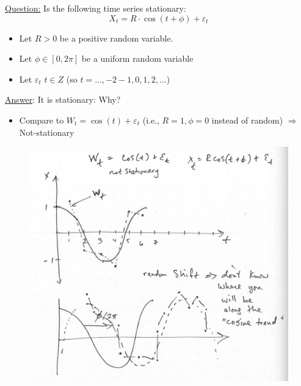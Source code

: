 \underline{Question:} Is the following time series stationary:\\
    \[X_t = R \cdot \cos(t+ \phi) + \varepsilon_t\] 
\begin{itemize}
    \item[] Let $R>0$ be a positive random variable.
    \item[] Let $\phi \in [0, 2\pi]$ be a uniform random variable
    \item[] Let $\varepsilon_t$ $t \in Z$ (so $t=...,-2-1,0,1,2,...$)
\end{itemize}
\underline{Answer}: It is stationary: Why? 
\begin{itemize}
    \item[] Compare to $W_t = \cos(t)+ \varepsilon_t$ (i.e., $R=1, \phi = 0$ instead of random) $\Rightarrow$ Not-stationary 
\end{itemize}

\begin{figure}[H]
\includegraphics[scale=0.25]{images/Screenshot 2024-04-29 at 08.38.34.jpg}
\centering
\end{figure}

